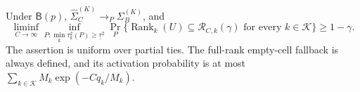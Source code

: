 Under \(\mathsf B(p)\), \(\widehat\Sigma_C^{(K)}\to_P\Sigma_B^{(K)}\), and \[\liminf_{C\to\infty}\inf_{P:\min_k\tau_k^2(P)\geq\underline\tau^2}\Pr_P\{\operatorname{Rank}_k(U)\subseteq\mathcal R_{C,k}(\gamma)\text{ for every }k\in\mathcal K\}\geq1-\gamma.\] The assertion is uniform over partial ties. The full-rank empty-cell fallback is always defined, and its activation probability is at most \(\sum_{k\in\mathcal K}M_k\exp(-Cq_k/M_k)\).